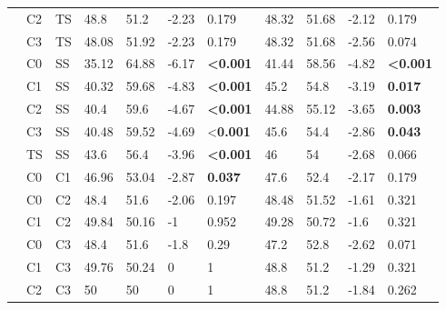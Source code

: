\documentclass{article}
\begin{document}
\begin{table}[htp]
\begin{tabular}{l l l l l l l l l l l}
\\
 & C2 & TS & 48.8 & 51.2 & -2.23 & 0.179
& 48.32 & 51.68 & -2.12 & 0.179
\\
 & C3 & TS & 48.08 & 51.92 & -2.23 & 0.179
& 48.32 & 51.68 & -2.56 & 0.074
\\
 & C0 & SS & 35.12 & 64.88 & -6.17 &\textbf{ \textless0.001}
& 41.44 & 58.56 & -4.82 & \textbf{\textless0.001}
\\
 & C1 & SS & 40.32 & 59.68 & -4.83 & \textbf{\textless0.001}
& 45.2 & 54.8 & -3.19 & \textbf{0.017}
\\
 & C2 & SS & 40.4 & 59.6 & -4.67 & \textbf{\textless0.001}
& 44.88 & 55.12 & -3.65 & \textbf{0.003}
\\
 & C3 & SS & 40.48 & 59.52 & -4.69 & \textless\textbf{0.001}
& 45.6 & 54.4 & -2.86 & \textbf{0.043}
\\
 & TS & SS & 43.6 & 56.4 & -3.96 &\textbf{\textless0.001}
& 46 & 54 & -2.68 & 0.066
\\
 & C0 & C1 & 46.96 & 53.04 & -2.87 & \textbf{0.037}
& 47.6 & 52.4 & -2.17 & 0.179
\\
 & C0 & C2 & 48.4 & 51.6 & -2.06 & 0.197
& 48.48 & 51.52 & -1.61 & 0.321
\\
 & C1 & C2 & 49.84 & 50.16 & -1 & 0.952
& 49.28 & 50.72 & -1.6 & 0.321
\\
 & C0 & C3 & 48.4 & 51.6 & -1.8 & 0.29
& 47.2 & 52.8 & -2.62 & 0.071
\\
 & C1 & C3 & 49.76 & 50.24 & 0 & 1
& 48.8 & 51.2 & -1.29 & 0.321
\\
 & C2 & C3 & 50 & 50 & 0 & 1
& 48.8 & 51.2 & -1.84 & 0.262
\\

\end{tabular}
\label{tab:stats_analysis}
\end{table}



\raggedbottom
\end{document}
